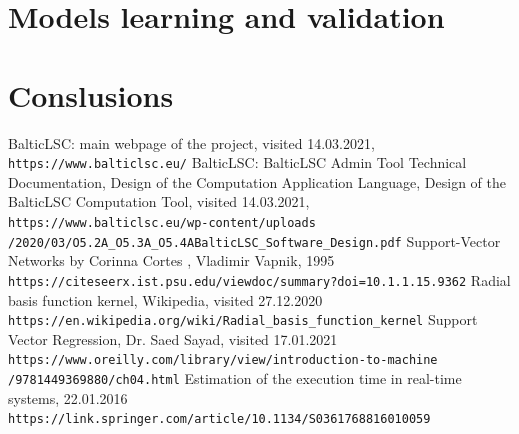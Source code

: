 \documentclass{article}
\begin{document}
	\section{Models learning and validation}
	
	\section{Conslusions}
	
	\begin{thebibliography}{9}
		BalticLSC: main webpage of the project, visited 14.03.2021,
		\\\texttt{https://www.balticlsc.eu/}
		 BalticLSC: BalticLSC Admin Tool Technical Documentation, Design of the Computation Application Language, Design of the BalticLSC Computation Tool, visited 14.03.2021,
		\\\texttt{https://www.balticlsc.eu/wp-content/uploads \newline /2020/03/O5.2A\_O5.3A\_O5.4ABalticLSC\_Software\_Design.pdf}
		Support-Vector Networks by Corinna Cortes , Vladimir Vapnik, 1995
		\\\texttt{https://citeseerx.ist.psu.edu/viewdoc/summary?doi=10.1.1.15.9362}
		Radial basis function kernel, Wikipedia, visited 27.12.2020
		\\\texttt{https://en.wikipedia.org/wiki/Radial\_basis\_function\_kernel}
		Support Vector Regression, Dr. Saed Sayad, visited 17.01.2021
		\\\texttt{https://www.oreilly.com/library/view/introduction-to-machine
			/9781449369880/ch04.html}
		Estimation of the execution time in real-time systems, 22.01.2016
		\\\texttt{https://link.springer.com/article/10.1134/S0361768816010059}
	\end{thebibliography}
	
	
\end{document}
